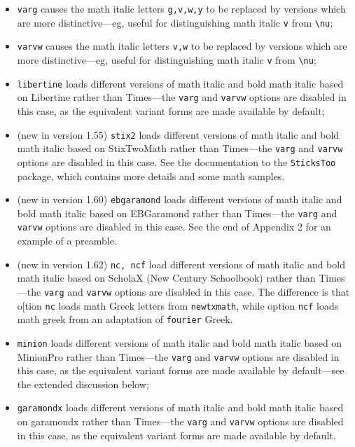\documentclass[11pt]{article}
\theoremstyle{oldplain}
\theoremstyle{plain}
\begin{document}
\begin{itemize}
\begin{verbatim}
\def\setSYdimens{\fontdimen16\font=2pt\fontdimen17\font=1.15\fontdimen17\font }
\end{verbatim}
Don't use these unless you know what you're doing.
\item {\tt varg} causes the math italic letters \verb|g,v,w,y| to be replaced by versions which are more distinctive---eg, useful for distinguishing math italic \verb|v| from \verb|\nu|;
\item {\tt varvw} causes the math italic letters \verb|v,w| to be replaced by versions which are more distinctive---eg, useful for distinguishing math italic \verb|v| from \verb|\nu|;
\item {\tt libertine} loads different versions of math italic and bold math italic based on \textsf{Libertine} rather than \textsf{Times}---the {\tt varg} and {\tt varvw} options are disabled in this case, as the equivalent variant forms are made available by default;
\item (new in version 1.55) {\tt stix2} loads different versions of math italic and bold math italic based on \textsf{StixTwoMath} rather than \textsf{Times}---the {\tt varg} and {\tt varvw} options are disabled in this case. See the documentation to the {\tt SticksToo} package, which contains more details and some math samples.
\item (new in version 1.60) {\tt ebgaramond} loads different versions of math italic and bold math italic based on \textsf{EBGaramond} rather than \textsf{Times}---the {\tt varg} and {\tt varvw} options are disabled in this case. See the end of Appendix 2 for an example of a preamble.
\item (new in version 1.62) {\tt nc, ncf} load different versions of math italic and bold math italic based on \textsf{ScholaX} (\textsf{New Century Schoolbook}) rather than \textsf{Times}---the {\tt varg} and {\tt varvw} options are disabled in this case. The difference is that o[tion {\tt nc} loads math Greek letters from {\tt newtxmath}, while option {\tt ncf} loads math greek from an adaptation of {\tt fourier} Greek.
\item {\tt minion} loads different versions of math italic and bold math italic based on \textsf{MinionPro} rather than \textsf{Times}---the {\tt varg} and {\tt varvw} options are disabled in this case, as the equivalent variant forms are made available by default---see the extended discussion below;
\item {\tt garamondx} loads different versions of math italic and bold math italic based on \textsf{garamondx} rather than \textsf{Times}---the {\tt varg} and {\tt varvw} options are disabled in this case, as the equivalent variant forms are made available by default.

\end{itemize}
\end{document}
